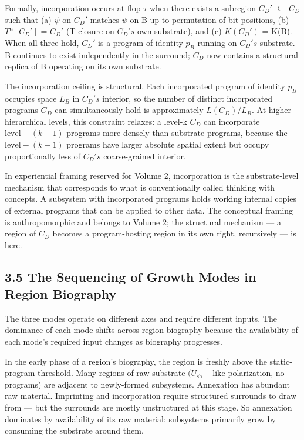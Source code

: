 \documentclass[11pt,oneside]{report}
\theoremstyle{definition}
\theoremstyle{remark}
\begin{document}
Formally, incorporation occurs at flop \ensuremath{\tau} when there exists a subregion
\ensuremath{C_{D}'} \ensuremath{\subseteq} \ensuremath{C_{D}} such that (a) \ensuremath{\psi} on \ensuremath{C_{D}'} matches \ensuremath{\psi} on B up to permutation
of bit positions, (b) \ensuremath{T^{n}[C_{D}']} = \ensuremath{C_{D}'} (T-closure on \ensuremath{C_{D}'s} own
substrate), and (c) \ensuremath{K(C_{D}')} = K(B). When all three hold, \ensuremath{C_{D}'} is a
program of identity \ensuremath{p_{B}} running on \ensuremath{C_{D}'s} substrate. B continues to
exist independently in the surround; \ensuremath{C_{D}} now contains a structural
replica of B operating on its own substrate.

The incorporation ceiling is structural. Each incorporated program of
identity \ensuremath{p_{B}} occupies space \ensuremath{L_{B}} in \ensuremath{C_{D}'s} interior, so the number of
distinct incorporated programs \ensuremath{C_{D}} can simultaneously hold is
approximately \ensuremath{L(C_{D})/L_{B}.} At higher hierarchical levels, this
constraint relaxes: a level-k \ensuremath{C_{D}} can incorporate \ensuremath{\text{level}-(k-1)} programs
more densely than substrate programs, because the \ensuremath{\text{level}-(k-1)} programs
have larger absolute spatial extent but occupy proportionally less of
\ensuremath{C_{D}'s} coarse-grained interior.

In experiential framing reserved for Volume 2, incorporation is the
substrate-level mechanism that corresponds to what is conventionally
called thinking with concepts. A subsystem with incorporated programs
holds working internal copies of external programs that can be applied
to other data. The conceptual framing is anthropomorphic and belongs to
Volume 2; the structural mechanism --- a region of \ensuremath{C_{D}} becomes a
program-hosting region in its own right, recursively --- is here.

\subsection*{3.5 The Sequencing of Growth Modes in Region Biography}

The three modes operate on different axes and require different inputs.
The dominance of each mode shifts across region biography because the
availability of each mode's required input changes as biography
progresses.

In the early phase of a region's biography, the region is freshly above
the static-program threshold. Many regions of raw substrate \ensuremath{(U_{\mathrm{sh}}-\text{like}}
polarization, no programs) are adjacent to newly-formed subsystems.
Annexation has abundant raw material. Imprinting and incorporation
require structured surrounds to draw from --- but the surrounds are
mostly unstructured at this stage. So annexation dominates by
availability of its raw material: subsystems primarily grow by consuming
the substrate around them.
\end{document}
